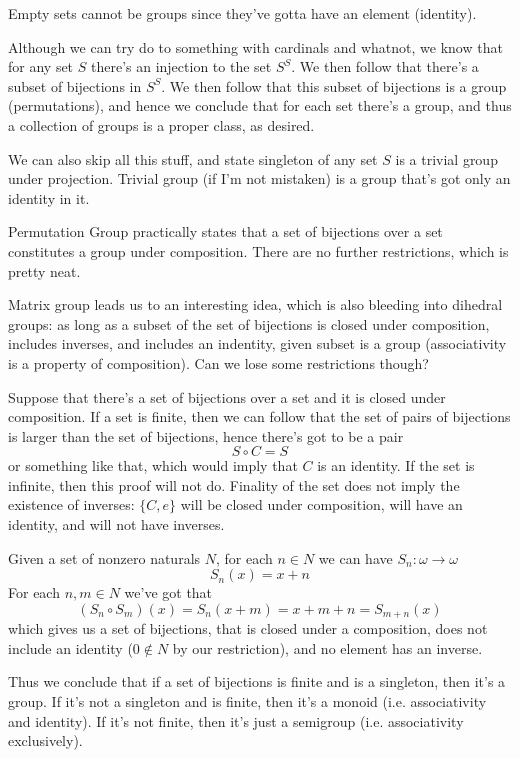 \documentclass[11pt,oneside,titlepage]{book}
\newcommand{\set}[1]{\{ #1 \}}
\begin{document}
Empty sets cannot be groups since they've gotta have an element (identity).

Although we can try do to something with cardinals and whatnot, we know that for
any set $S$ there's an injection to the set $S^S$. We then follow that there's
a subset of bijections in $S^S$. We then follow that this subset of bijections
is a group (permutations), and hence we conclude that for each set there's a
group, and thus a collection of groups is a proper class, as desired.

We can also skip all this stuff, and state singleton of any set $S$ is
a trivial group under projection. Trivial group (if I'm not mistaken) is a
group that's got only an identity in it.

Permutation Group practically states that a set of bijections over a
set constitutes a group under composition. There are no further
restrictions, which is pretty neat.

Matrix group leads us to an interesting idea, which is also bleeding
into dihedral groups: as long as a subset of the set of bijections is
closed under composition, includes inverses, and includes an
indentity, given subset is a group (associativity is a property of
composition). Can we lose some restrictions though?

Suppose that there's a set of bijections over a set and it is closed
under composition. If a set is finite, then we can follow that the set of pairs of
bijections is larger than the set of bijections, hence there's got to be a pair
$$S \circ C = S$$
or something like that, which would imply that $C$ is an identity.
If the set is infinite, then this proof will not do.
Finality of the set does not imply the existence of inverses: $\set{C, e}$ will be
closed under composition, will have an identity, and will not have inverses.

Given a set of nonzero naturals $N$, for each $n \in N$ we can have $S_n: \omega \to \omega$
$$S_n(x) = x + n$$
For each $n, m \in N$ we've got that
$$(S_n \circ S_m)(x) = S_n(x + m) = x + m + n = S_{m + n}(x)$$
which gives us a set of bijections, that is closed under a
composition, does not include an identity ($0 \notin N$ by our
restriction), and no element has an inverse.

Thus we conclude that if a set of bijections is finite and is a singleton, then it's a group.
If it's not a singleton and is finite, then it's a monoid (i.e. associativity and identity).
If it's not finite, then it's just a semigroup (i.e. associativity exclusively).
\end{document}
